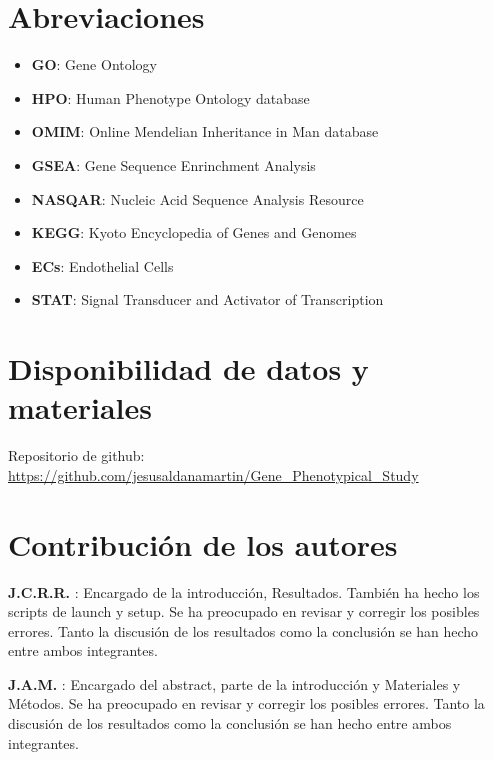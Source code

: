 \documentclass{bmcart}
\begin{document}
	\begin{backmatter}
	
		\section*{Abreviaciones}%
			\begin{itemize}
				\item \label{GO} \textbf{GO}: Gene Ontology 
				\item \label{HPO} \textbf{HPO}: Human Phenotype Ontology database
				\item  \label{OMIM} \textbf{OMIM}: Online Mendelian Inheritance in Man database
				\item \label{GSEA} \textbf{GSEA}: Gene Sequence Enrinchment Analysis
				\item \label{NASQAR} \textbf{NASQAR}: Nucleic Acid Sequence Analysis Resource
				\item \label{KEGG} \textbf{KEGG}: Kyoto Encyclopedia of Genes and Genomes
				\item \label{ECs} \textbf{ECs}: Endothelial Cells
				\item \label{STAT} \textbf{STAT}: Signal Transducer and Activator of Transcription
			\end{itemize}
		
		\section*{Disponibilidad de datos y materiales}%
			Repositorio de github:
			\href{https://github.com/jesusaldanamartin/Gene_Phenotypical_Study}{https://github.com/jesusaldanamartin/Gene\_Phenotypical\_Study}
		
		\section*{Contribución de los autores}
			\textbf{J.C.R.R.} : Encargado de la introducción, Resultados. También ha hecho los scripts de launch y setup. Se ha preocupado en revisar y corregir los posibles errores. Tanto la discusión de los resultados como la conclusión se han hecho entre ambos integrantes.
			
			\textbf{J.A.M.} : Encargado del abstract, parte de la introducción y Materiales y Métodos. Se ha preocupado en revisar y corregir los posibles errores. Tanto la discusión de los resultados como la conclusión se han hecho entre ambos integrantes.
		
		
		
	
	\end{backmatter}
\end{document}

